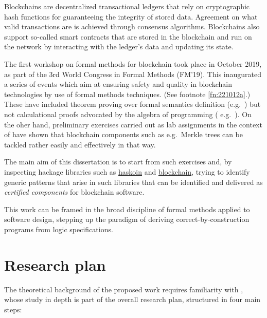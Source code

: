 \documentclass[a4paper, 11pt]{article} %
\begin{document}
Blockchains are decentralized transactional ledgers that rely on cryptographic hash functions for guaranteeing the integrity of stored data. Agreement on what valid transactions are is achieved through consensus algorithms. Blockchains also support so-called smart contracts that are stored in the blockchain and run on the network by interacting with the ledger’s data and updating its state. 

The first workshop on formal methods for blockchain took place in October 2019, as part of the 3rd World Congress in Formal Methods (FM'19). This inaugurated a series of events which aim at ensuring safety and quality in blockchain technologies by use of formal methods techniques. (See footnote \ref{fn:221012a}.) These have included theorem proving  over formal semantics definition (e.g.\ \cite{DBLP:conf/cav/GabbayJS21}) but not calculational proofs advocated by the algebra of programming ( e.g.\ \cite{BM97}). On the oher hand, preliminary exercises carried out as lab assignments in the context of \cite{Ol05} %
have shown that blockchain components such as e.g.\ Merkle trees can be tackled rather easily and effectively in that way.

The main aim of this dissertation is to start from such exercises and,
by inspecting hackage libraries such as \href{https://hackage.haskell.org/package/haskoin-core}{haskoin} and \href{https://hackage.haskell.org/package/blockchain}{blockchain}, trying to identify generic patterns that arise in such libraries that can be identified and delivered as \emph{certified components} for blockchain software.

This work can be framed in the broad discipline of formal methods applied to
software design, stepping up the paradigm of deriving correct-by-construction
programs from logic specifications.


\section*{Research plan}

The theoretical background of the proposed work requires familiarity with
\cite{BM97,Ol05}, whose study in depth is part of
the overall research plan, structured in four main steps:
\end{document}
